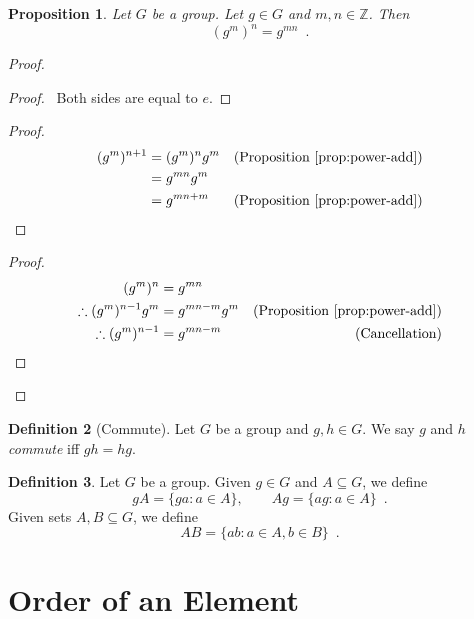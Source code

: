 \documentclass{book}
\let\qed\relax
\newtheorem{prop}{Proposition}[chapter]
\theoremstyle{definition}
\newtheorem{df}[prop]{Definition}
\begin{document}
\begin{prop}
    \label{prop:power-mult}
    Let $G$ be a group. Let $g \in G$ and $m,n \in \mathbb{Z}$. Then
    \[ (g^m)^n = g^{mn} \enspace . \]
\end{prop}

\begin{proof}
    \pf
    \begin{proof}
        \pf\ Both sides are equal to $e$.
    \end{proof}
    \begin{proof}
        \pf
        \begin{align*}
            (g^m)^{n+1} & = (g^m)^n g^m & (\text{Proposition \ref{prop:power-add}}) \\
                        & = g^{mn} g^m                                              \\
                        & = g^{mn + m}  & (\text{Proposition \ref{prop:power-add}})
        \end{align*}
    \end{proof}
    \begin{proof}
        \pf
        \begin{align*}
            (g^m)^n                    & = g^{mn}                                                   \\
            \therefore (g^m)^{n-1} g^m & = g^{mn-m} g^m & (\text{Proposition \ref{prop:power-add}}) \\
            \therefore (g^m)^{n-1}     & = g^{mn-m}     & (\text{Cancellation})
        \end{align*}
    \end{proof}
    \qed
\end{proof}

\begin{df}[Commute]
    Let $G$ be a group and $g,h \in G$. We say $g$ and $h$ \emph{commute} iff $gh = hg$.
\end{df}

\begin{df}
Let $G$ be a group. Given $g \in G$ and $A \subseteq G$, we define
\[ gA = \{ ga : a \in A \}, \qquad Ag = \{ ag : a \in A \} \enspace . \]
Given sets $A,B \subseteq G$, we define
\[ AB = \{ ab : a \in A, b \in B \} \enspace . \]
\end{df}

\section{Order of an Element}
\end{document}
